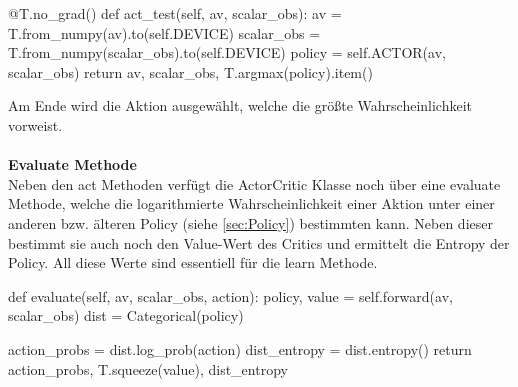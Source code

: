 \begin{python}
 	@T.no_grad()
 	def act_test(self, av, scalar_obs):
	 	av = T.from_numpy(av).to(self.DEVICE)
	 	scalar_obs = T.from_numpy(scalar_obs).to(self.DEVICE)
	 	policy = self.ACTOR(av, scalar_obs)
	 	return av, scalar_obs, T.argmax(policy).item()
\end{python}
Am Ende wird die Aktion ausgewählt, welche die größte Wahrscheinlichkeit vorweist.\\
\\\textbf{Evaluate Methode}\\
Neben den act Methoden verfügt die ActorCritic Klasse noch über eine evaluate Methode, welche die logarithmierte Wahrscheinlichkeit einer Aktion unter einer anderen bzw. älteren Policy (siehe \ref{sec:Policy}) bestimmten kann. Neben dieser bestimmt sie auch noch den Value-Wert des Critics und ermittelt die Entropy der Policy. All diese Werte sind essentiell für die learn Methode.
\begin{python}
    def evaluate(self, av, scalar_obs, action):
		policy, value = self.forward(av, scalar_obs)
		dist = Categorical(policy)
		
		action_probs = dist.log_prob(action)
		dist_entropy = dist.entropy()
		return action_probs, T.squeeze(value), dist_entropy
\end{python}

